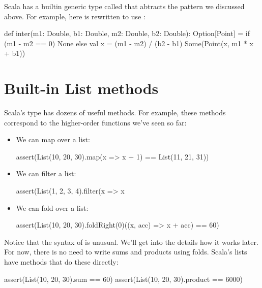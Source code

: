 \documentclass{book}
\begin{document}
Scala has a builtin generic type called  that abtracts the
pattern we discussed above. For example, here is  rewritten
to use :

\begin{scalacode}
def inter(m1: Double, b1: Double, m2: Double, b2: Double): Option[Point] = {
  if (m1 - m2 == 0) {
    None
  }
  else {
    val x = (m1 - m2) / (b2 - b1)
    Some(Point(x, m1 * x + b1))
  }
}
\end{scalacode}

\section{Built-in List methods}

Scala's  type has dozens of useful methods. For example,
these methods correspond to the higher-order functions we've seen so far:
%
\begin{itemize}

  \item We can map over a list:

  \begin{scalacode}
  assert(List(10, 20, 30).map(x => x + 1) == List(11, 21, 31))
  \end{scalacode}

  \item We can filter a list:

  \begin{scalacode}
  assert(List(1, 2, 3, 4).filter(x => x %
  \end{scalacode}

  \item We can fold over a list:

  \begin{scalacode}
  assert(List(10, 20, 30).foldRight(0)((x, acc) => x + acc) == 60)
  \end{scalacode}

\end{itemize}

Notice that the syntax of  is unusual. We'll get into the
details how it works later. For now, there is no need to write sums and products
using folds. Scala's lists have methods that do these directly:

\begin{scalacode}
assert(List(10, 20, 30).sum == 60)
assert(List(10, 20, 30).product == 6000)
\end{scalacode}
\end{document}
